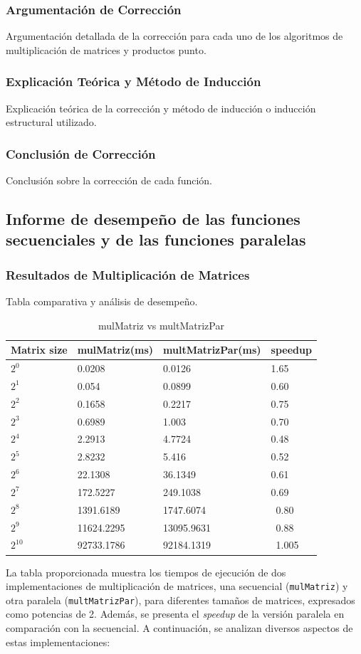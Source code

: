 \documentclass[12pt, a4paper]{article}
\begin{document}
\subsubsection{Argumentación de Corrección}
Argumentación detallada de la corrección para cada uno de los algoritmos de multiplicación de matrices y productos punto.
\subsubsection{Explicación Teórica y Método de Inducción}
Explicación teórica de la corrección y método de inducción o inducción estructural utilizado.
\subsubsection{Conclusión de Corrección}
Conclusión sobre la corrección de cada función.

\subsection{Informe de desempeño de las funciones secuenciales y de las funciones paralelas}
\subsubsection{Resultados de Multiplicación de Matrices}
Tabla comparativa y análisis de desempeño.

\begin{table}[h]
    \centering
    \begin{tabular}{ | m{2cm} | m{3cm} | m{4cm} | m{3cm} | }
    \hline
    Matrix size & mulMatriz(ms) & multMatrizPar(ms) & speedup \\ 
    \hline
    $2^0$ & 0.0208 & 0.0126 & 1.65 \\
    $2^1$ & 0.054 & 0.0899 & 0.60 \\
    $2^2$ & 0.1658 & 0.2217 & 0.75 \\
    $2^3$ & 0.6989 & 1.003 & 0.70 \\
    $2^4$ & 2.2913 & 4.7724 & 0.48 \\
    $2^5$ & 2.8232 & 5.416 & 0.52 \\
    $2^6$ & 22.1308 & 36.1349 & 0.61 \\
    $2^7$ & 172.5227 & 249.1038 & 0.69 \\
    $2^8$ & 1391.6189 & 1747.6074 & 0.80 \\
    $2^9$ & 11624.2295 & 13095.9631 & 0.88 \\
    $2^{10}$ & 92733.1786 & 92184.1319 & 1.005 \\
    \hline
    \end{tabular}
    \caption{mulMatriz vs multMatrizPar}
    \label{table:matrix_performance}
\end{table}
La tabla proporcionada muestra los tiempos de ejecución de dos implementaciones de multiplicación de matrices, una secuencial (\texttt{mulMatriz}) y otra paralela (\texttt{multMatrizPar}), para diferentes tamaños de matrices, expresados como potencias de 2. Además, se presenta el \textit{speedup} de la versión paralela en comparación con la secuencial. A continuación, se analizan diversos aspectos de estas implementaciones:
\end{document}
